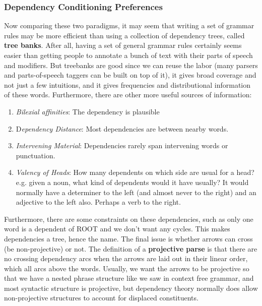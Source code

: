 \documentclass{article}
\begin{document}
    \subsubsection{Dependency Conditioning Preferences}

      Now comparing these two paradigms, it may seem that writing a set of grammar rules may be more efficient than using a collection of dependency trees, called \textbf{tree banks}. After all, having a set of general grammar rules certainly seems easier than getting people to annotate a bunch of text with their parts of speech and modifiers. But treebanks are good since we can reuse the labor (many parsers and parts-of-speech taggers can be built on top of it), it gives broad coverage and not just a few intuitions, and it gives frequencies and distributional information of these words. Furthermore, there are other more useful sources of information: 
      \begin{enumerate}
        \item \textit{Bilexial affinities}: The dependency is plausible 
        \item D\textit{ependency Distance}: Most dependencies are between nearby words. 
        \item \textit{Intervening Material}: Dependencies rarely span intervening words or punctuation. 
        \item \textit{Valency of Heads}: How many dependents on which side are usual for a head? e.g. given a noun, what kind of dependents would it have usually? It would normally have a determiner to the left (and almost never to the right) and an adjective to the left also. Perhaps a verb to the right. 
      \end{enumerate}

      Furthermore, there are some constraints on these dependencies, such as only one word is a dependent of ROOT and we don't want any cycles. This makes dependencies a tree, hence the name. The final issue is whether arrows can cross (be non-projective) or not. The definition of a \textbf{projective parse} is that there are no crossing dependency arcs when the arrows are laid out in their linear order, which all arcs above the words. Usually, we want the arrows to be projective so that we have a nested phrase structure like we saw in context free grammar, and most syntactic structure is projective, but dependency theory normally does allow non-projective structures to account for displaced constituents. 
\end{document}
